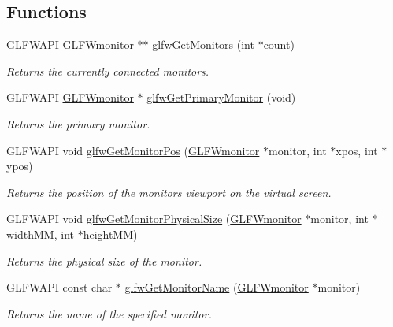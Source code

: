 \subsection*{Functions}
\begin{DoxyCompactItemize}
\item 
G\+L\+F\+W\+A\+P\+I \hyperlink{group__monitor_ga8d9efd1cde9426692c73fe40437d0ae3}{G\+L\+F\+Wmonitor} $\ast$$\ast$ \hyperlink{group__monitor_gab4d483284c57e28837bc2cd9639e9665}{glfw\+Get\+Monitors} (int $\ast$count)
\begin{DoxyCompactList}\small\item\em Returns the currently connected monitors. \end{DoxyCompactList}\item 
G\+L\+F\+W\+A\+P\+I \hyperlink{group__monitor_ga8d9efd1cde9426692c73fe40437d0ae3}{G\+L\+F\+Wmonitor} $\ast$ \hyperlink{group__monitor_ga59ea49f377fe701dd76764183e64d9f4}{glfw\+Get\+Primary\+Monitor} (void)
\begin{DoxyCompactList}\small\item\em Returns the primary monitor. \end{DoxyCompactList}\item 
G\+L\+F\+W\+A\+P\+I void \hyperlink{group__monitor_ga45b5481a614ad7beb2aade9746d07563}{glfw\+Get\+Monitor\+Pos} (\hyperlink{group__monitor_ga8d9efd1cde9426692c73fe40437d0ae3}{G\+L\+F\+Wmonitor} $\ast$monitor, int $\ast$xpos, int $\ast$ypos)
\begin{DoxyCompactList}\small\item\em Returns the position of the monitor\textquotesingle{}s viewport on the virtual screen. \end{DoxyCompactList}\item 
G\+L\+F\+W\+A\+P\+I void \hyperlink{group__monitor_gad0e93a9e42b32394369cabbbdc1ab702}{glfw\+Get\+Monitor\+Physical\+Size} (\hyperlink{group__monitor_ga8d9efd1cde9426692c73fe40437d0ae3}{G\+L\+F\+Wmonitor} $\ast$monitor, int $\ast$width\+M\+M, int $\ast$height\+M\+M)
\begin{DoxyCompactList}\small\item\em Returns the physical size of the monitor. \end{DoxyCompactList}\item 
G\+L\+F\+W\+A\+P\+I const char $\ast$ \hyperlink{group__monitor_ga22f62011bae33ea8d2974eff5d14f9b8}{glfw\+Get\+Monitor\+Name} (\hyperlink{group__monitor_ga8d9efd1cde9426692c73fe40437d0ae3}{G\+L\+F\+Wmonitor} $\ast$monitor)
\begin{DoxyCompactList}\small\item\em Returns the name of the specified monitor. \end{DoxyCompactList}\item 
$$
\end{DoxyCompactItemize}
